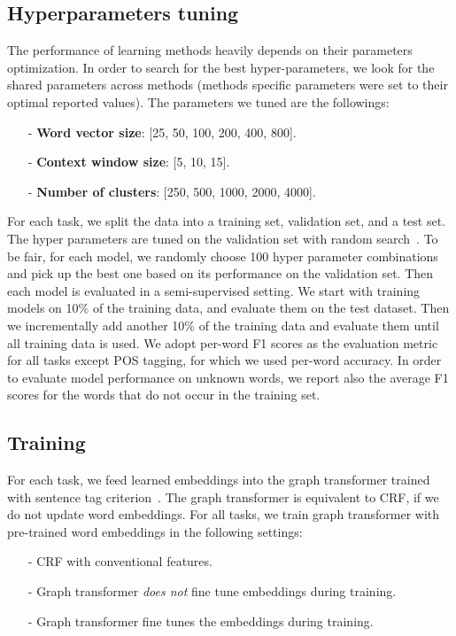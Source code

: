 \documentclass[11pt]{article}
\begin{document}
\subsection{Hyperparameters tuning}

The performance of learning methods heavily depends on their parameters optimization. 
In order to search for the best hyper-parameters, we look for the shared parameters across methods (methods specific parameters were set to their optimal reported values). The parameters we tuned are the followings:

\begin{small}
\begin{itemize}
\item[-]\textbf{Word vector size}: [25, 50, 100, 200, 400, 800].
\item[-]\textbf{Context window size}: [5, 10, 15].
\item[-]\textbf{Number of clusters}: [250, 500, 1000, 2000, 4000]. 
\end{itemize}
\end{small}

For each task, we split the data into a training set, validation set, and a test set. The hyper parameters are tuned on the validation set with random search~\cite{bergstra2012random}. To be fair, for each model, we randomly choose 100 hyper parameter combinations and pick up the best one based on its performance on the validation set. Then each model is evaluated in a semi-supervised setting. We start with training models on 10\% of the training data, and evaluate them on the test dataset. Then we incrementally add another 10\% of the training data and evaluate them until all training data is used. We adopt per-word F1 scores as the evaluation metric for all tasks except POS tagging, for which we used per-word accuracy.
In order to evaluate model performance on unknown words, we report also the average F1 scores for the words that do not occur in the training set.


\subsection{Training}
For each task, we feed learned embeddings into the graph transformer trained with sentence tag criterion~\cite{turian2010word}. The graph transformer is equivalent to CRF, if we do not update word embeddings. For all tasks, we train graph transformer with pre-trained word embeddings in the following settings: 

\begin{small}
\begin{itemize}
\item[-] CRF with conventional features.
\item[-] Graph transformer \textit{does not} fine tune embeddings during training.
\item[-] Graph transformer fine tunes the embeddings during training.
\end{itemize}
\end{small}
\end{document}
